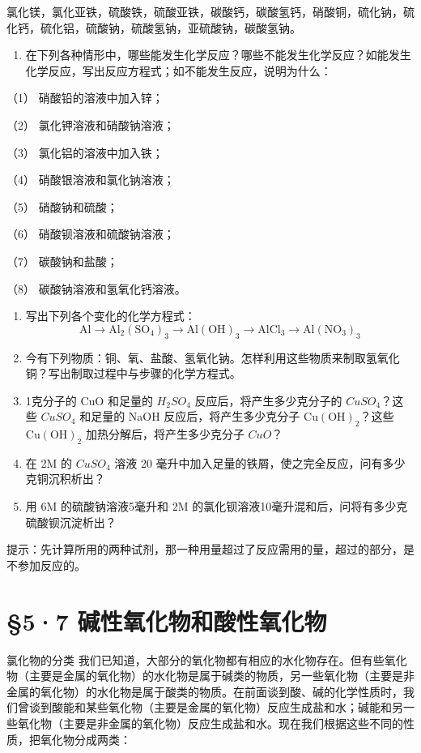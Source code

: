 氯化镁，氯化亚铁，硫酸铁，硫酸亚铁，碳酸钙，碳酸氢钙，硝酸铜，硫化钠，硫化钙，硫化铝，硫酸钠，硫酸氢钠，亚硫酸钠，碳酸氢钠。

\begin{enumerate}[start=3]
\item
  在下列各种情形中，哪些能发生化学反应？哪些不能发生化学反应？如能发生化学反应，写出反应方程式；如不能发生反应，说明为什么：
\end{enumerate}

（1） 硝酸铅的溶液中加入锌；

（2） 氯化钾溶液和硝酸钠溶液；

（3） 氯化铝的溶液中加入铁；

（4） 硝酸银溶液和氯化钠溶液；

（5） 硝酸钠和硫酸；

（6） 硝酸钡溶液和硫酸钠溶液；

（7） 碳酸钠和盐酸；

（8） 碳酸钠溶液和氢氧化钙溶液。

\begin{enumerate}[start=4]
\item
  写出下列各个变化的化学方程式：
\[
\mathrm{Al} \rightarrow \mathrm{Al}_{2} (\mathrm{SO}_{4}) _ {3} \rightarrow \mathrm{Al} (\mathrm{OH}) _ {3} \rightarrow \mathrm{AlCl}_{3} \rightarrow \mathrm{Al} (\mathrm{NO}_{3}) _ {3}
\]
\item
  今有下列物质：铜、氧、盐酸、氢氧化钠。怎样利用这些物质来制取氢氧化铜？写出制取过程中与步骤的化学方程式。
\item
  1克分子的 CuO 和足量的 \(H_{2}SO_{4}\) 反应后，将产生多少克分子的
  \(CuSO_{4}\)？这些 \(CuSO_{4}\) 和足量的 NaOH 反应后，将产生多少克分子
  \(\mathrm{Cu(OH)}_{2}\)？这些 \(\mathrm{Cu(OH)}_{2}\)
  加热分解后，将产生多少克分子 \(CuO\)？
\item
  在 2M 的 \(CuSO_{4}\) 溶液 20
  毫升中加入足量的铁屑，使之完全反应，问有多少克铜沉积析出？
\item
  用 \(6\mathrm{M}\) 的硫酸钠溶液5毫升和 \(2\mathrm{M}\)
  的氯化钡溶液10毫升混和后，问将有多少克硫酸钡沉淀析出？
\end{enumerate}

提示：先计算所用的两种试剂，那一种用量超过了反应需用的量，超过的部分，是不参加反应的。

\section{§5·7 碱性氧化物和酸性氧化物}

氯化物的分类
我们已知道，大部分的氧化物都有相应的水化物存在。但有些氧化物（主要是金属的氧化物）的水化物是属于碱类的物质，另一些氧化物（主要是非金属的氧化物）的水化物是属于酸类的物质。在前面谈到酸、碱的化学性质时，我们曾谈到酸能和某些氧化物（主要是金属的氧化物）反应生成盐和水；碱能和另一些氧化物（主要是非金属的氧化物）反应生成盐和水。现在我们根据这些不同的性质，把氧化物分成两类：


